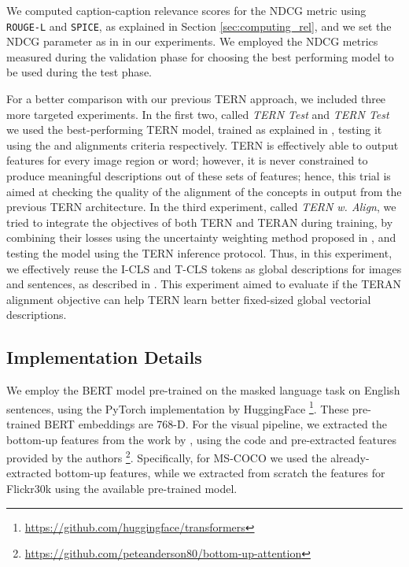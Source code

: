 \documentclass[acmsmall]{acmart}
\newif\ifdraft
\newcommand{\majorrevised}[1]{#1}
\newcommand{\revised}[1]{\ifdraft{\leavevmode\color{blue}{#1}}\else{#1}\fi}
\begin{document}
We computed caption-caption relevance scores for the NDCG metric using \texttt{ROUGE-L}\cite{lin-2004-rouge} and \texttt{SPICE}\cite{AndersonFJG16spice}, as explained in Section \ref{sec:computing_rel}, and we set the NDCG parameter  as in \cite{carrara2018pictureit} in our experiments.
We employed the NDCG metrics measured during the validation phase for choosing the best performing model to be used during the test phase.

\majorrevised{For a better comparison with our previous TERN approach, we included three more targeted experiments.}
In the first two, called \textit{TERN  Test} and \textit{TERN  Test} we used the best-performing TERN model, trained as explained in \cite{messina2020tern}, testing it using the  and  alignments criteria respectively. TERN is effectively able to output features for every image region or word; however, it is never constrained to produce meaningful descriptions out of these sets of features; hence, this trial is aimed at checking the quality of the alignment of the concepts in output from the previous TERN architecture. 
\majorrevised{In the third experiment, called \textit{TERN w. Align}, we tried to integrate the objectives of both TERN and TERAN during training, by combining their losses using the uncertainty weighting method proposed in \cite{kendall2018multi}, and testing the model using the TERN inference protocol. \revised{Thus, in this experiment, we effectively reuse the I-CLS and T-CLS tokens as global descriptions for images and sentences, as described in \cite{messina2020tern}}. This experiment aimed to evaluate if the TERAN alignment objective can help TERN learn better fixed-sized global vectorial descriptions.
}

\subsection{Implementation Details}
We employ the BERT model pre-trained on the masked language task on English sentences, using the PyTorch implementation by HuggingFace \footnote{\url{https://github.com/huggingface/transformers}}. These pre-trained BERT embeddings are 768-D.
For the visual pipeline, we extracted the bottom-up features from the work by \cite{Anderson2018bottomup}, using the code and pre-extracted features provided by the authors \footnote{\url{https://github.com/peteanderson80/bottom-up-attention}}. Specifically, for MS-COCO we used the already-extracted bottom-up features, while we extracted from scratch the features for Flickr30k using the available pre-trained model.
\end{document}

